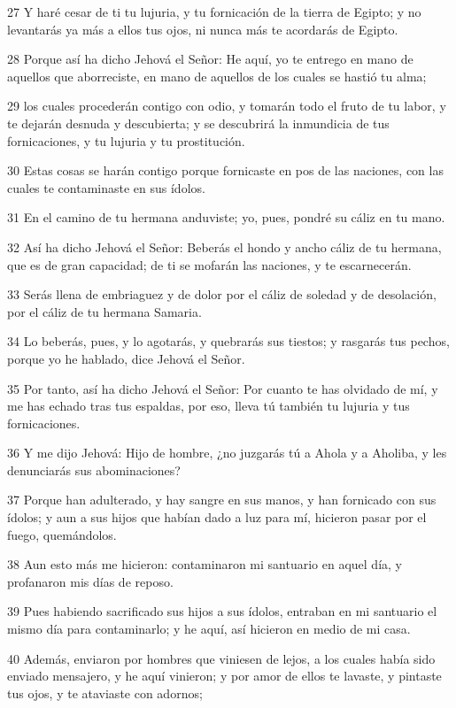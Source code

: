 \par 27 Y haré cesar de ti tu lujuria, y tu fornicación de la tierra de Egipto; y no levantarás ya más a ellos tus ojos, ni nunca más te acordarás de Egipto.
\par 28 Porque así ha dicho Jehová el Señor: He aquí, yo te entrego en mano de aquellos que aborreciste, en mano de aquellos de los cuales se hastió tu alma;
\par 29 los cuales procederán contigo con odio, y tomarán todo el fruto de tu labor, y te dejarán desnuda y descubierta; y se descubrirá la inmundicia de tus fornicaciones, y tu lujuria y tu prostitución.
\par 30 Estas cosas se harán contigo porque fornicaste en pos de las naciones, con las cuales te contaminaste en sus ídolos.
\par 31 En el camino de tu hermana anduviste; yo, pues, pondré su cáliz en tu mano.
\par 32 Así ha dicho Jehová el Señor: Beberás el hondo y ancho cáliz de tu hermana, que es de gran capacidad; de ti se mofarán las naciones, y te escarnecerán.
\par 33 Serás llena de embriaguez y de dolor por el cáliz de soledad y de desolación, por el cáliz de tu hermana Samaria.
\par 34 Lo beberás, pues, y lo agotarás, y quebrarás sus tiestos; y rasgarás tus pechos, porque yo he hablado, dice Jehová el Señor.
\par 35 Por tanto, así ha dicho Jehová el Señor: Por cuanto te has olvidado de mí, y me has echado tras tus espaldas, por eso, lleva tú también tu lujuria y tus fornicaciones.
\par 36 Y me dijo Jehová: Hijo de hombre, ¿no juzgarás tú a Ahola y a Aholiba, y les denunciarás sus abominaciones?
\par 37 Porque han adulterado, y hay sangre en sus manos, y han fornicado con sus ídolos; y aun a sus hijos que habían dado a luz para mí, hicieron pasar por el fuego, quemándolos.
\par 38 Aun esto más me hicieron: contaminaron mi santuario en aquel día, y profanaron mis días de reposo.
\par 39 Pues habiendo sacrificado sus hijos a sus ídolos, entraban en mi santuario el mismo día para contaminarlo; y he aquí, así hicieron en medio de mi casa.
\par 40 Además, enviaron por hombres que viniesen de lejos, a los cuales había sido enviado mensajero, y he aquí vinieron; y por amor de ellos te lavaste, y pintaste tus ojos, y te ataviaste con adornos;
